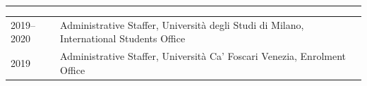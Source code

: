 \hrule %
\vspace{2mm}

\begin{longtable}[l]{@{}p{} p{}}

    2019--2020 & Administrative Staffer, Università degli Studi di Milano, International Students Office \vspace{2mm} \\
    
    2019 & Administrative Staffer, Università Ca' Foscari Venezia, Enrolment Office \\

\end{longtable}